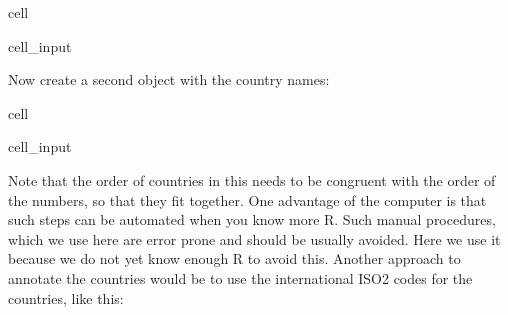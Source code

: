 \documentclass[letterpaper,10pt,english]{jupyterBook}
\begin{document}
\begin{sphinxuseclass}{cell}\begin{sphinxVerbatimInput}

\begin{sphinxuseclass}{cell_input}
\begin{sphinxVerbatim}[commandchars=\\\{\}]
\end{sphinxVerbatim}

\end{sphinxuseclass}\end{sphinxVerbatimInput}

\end{sphinxuseclass}
\sphinxAtStartPar
Now create a second object with the country names:

\begin{sphinxuseclass}{cell}\begin{sphinxVerbatimInput}

\begin{sphinxuseclass}{cell_input}
\begin{sphinxVerbatim}[commandchars=\\\{\}]
\end{sphinxVerbatim}

\end{sphinxuseclass}\end{sphinxVerbatimInput}

\end{sphinxuseclass}
\sphinxAtStartPar
Note that the order of countries in this needs to be congruent with the order of the numbers, so that they fit together. One advantage of the computer is that such steps can be automated when you know more R. Such manual procedures, which we use here are error prone and should be usually avoided. Here we use it because we do not yet know enough R to avoid this. Another approach to annotate the countries would be to use the international ISO2 codes for the countries, like this:
\end{document}
